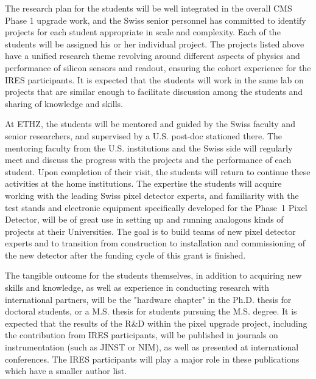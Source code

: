 The research plan for the students will be well integrated in the
overall CMS Phase 1 upgrade work, and the Swiss senior personnel has
committed to identify projects for each student appropriate in scale
and complexity. Each of the students will be assigned his or her
individual project. The projects listed above have a unified research
theme revolving around different aspects of physics and performance of
silicon sensors and readout, ensuring the cohort experience for the
IRES participants. It is expected that the students will work in the
same lab on projects that are similar enough to facilitate discussion
among the students and sharing of knowledge and skills. 

At ETHZ, the students will be mentored and guided by the Swiss faculty
and senior researchers, and supervised by a U.S. post-doc stationed
there.  The mentoring faculty from the U.S. institutions and the Swiss
side will regularly meet and discuss the progress with the projects
and the performance of each student.  Upon completion of their visit,
the students will return to continue these activities at the home
institutions.  The expertise the students will acquire working with
the leading Swiss pixel detector experts, and familiarity with the
test stands and electronic equipment specifically developed for the
Phase~1 Pixel Detector, will be of great use in setting up and running
analogous kinds of projects at their Universities.
The goal is to build teams of new pixel detector experts and to
transition from construction to installation and commissioning of the
new detector after the funding cycle of this grant is finished.

The tangible outcome for the students themselves, in addition to
acquiring new skills and knowledge, as well as experience in
conducting research with international partners, will be the "hardware
chapter" in the Ph.D. thesis for doctoral students, or a M.S. thesis
for students pursuing the M.S. degree. It is expected that the results
of the R\&D within the pixel upgrade project, including the
contribution from IRES participants, will be published in journals on
instrumentation (such as JINST or NIM), as well as presented at
international conferences. The IRES participants will play a major
role in these publications which have a smaller author list.

